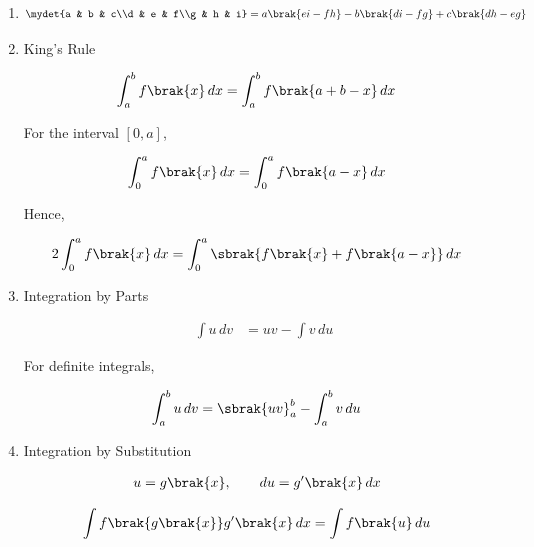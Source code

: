

\begin{enumerate}[label=\thesubsection.\arabic*, ref=\thesubsection.\theenumi]

\item
\begin{align}
\mydet{a & b & c\\d & e & f\\g & h & i} = a\brak{ei - fh} - b\brak{di - fg} + c\brak{dh - eg}
\label{eq:EE26BTECH11211-Prob_1}
\end{align}

\item 
King's Rule

\begin{align}
\int_a^b f\brak{x}\,dx
&= \int_a^b f\brak{a+b-x}\,dx
\label{eq:EE26BTECH11211-Prob_2.1}
\end{align}

For the interval $[0,a]$,

\begin{align}
\int_0^a f\brak{x}\,dx
&= \int_0^a f\brak{a-x}\,dx
\label{eq:EE26BTECH11211-Prob_2.2}
\end{align}

Hence,

\begin{align}
2\int_0^a f\brak{x}\,dx
&= \int_0^a \sbrak{f\brak{x}+f\brak{a-x}}\,dx
\label{eq:EE26BTECH11211-Prob_2.3}
\end{align}

\item 
Integration by Parts

\begin{align}
\int u\,dv &= uv-\int v\,du
\label{eq:EE26BTECH11211-Prob_3.1}
\end{align}

For definite integrals,

\begin{align}
\int_a^b u\,dv
&= \sbrak{uv}_a^b-\int_a^b v\,du
\label{eq:EE26BTECH11211-Prob_3.2}
\end{align}

\item 
Integration by Substitution

\begin{align}
u &= g\brak{x}, \qquad du=g'\brak{x}\,dx
\end{align}

\begin{align}
\int f\brak{g\brak{x}}g'\brak{x}\,dx
&= \int f\brak{u}\,du
\label{eq:EE26BTECH11211-Prob_4.1}
\end{align}


\end{enumerate}
